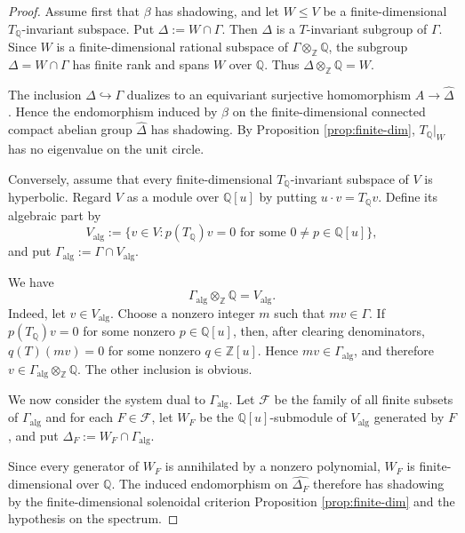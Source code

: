 \documentclass[10pt,a4paper]{amsart}
\begin{document}
\begin{proof}
Assume first that $\beta$ has shadowing, and let $W\leq V$ be a
finite-dimensional $T_{\mathbb Q}$-invariant subspace. Put
$\Delta:=W\cap\Gamma$. Then $\Delta$ is a $T$-invariant subgroup of
$\Gamma$. Since $W$ is a finite-dimensional rational subspace of
$\Gamma\otimes_{\mathbb Z}\mathbb Q$, the subgroup
$\Delta=W\cap\Gamma$ has finite rank and spans $W$ over $\mathbb Q$.
Thus
$
\Delta\otimes_{\mathbb Z}\mathbb Q=W.
$

The inclusion $\Delta\hookrightarrow\Gamma$ dualizes to an equivariant
surjective homomorphism $A\to\widehat\Delta$. Hence the endomorphism
induced by $\beta$ on the finite-dimensional connected compact abelian group
$\widehat\Delta$ has shadowing. By Proposition \ref{prop:finite-dim}, $T_{\mathbb Q}|_W$ has no eigenvalue on the unit circle.

Conversely, assume that every finite-dimensional
$T_{\mathbb Q}$-invariant subspace of $V$ is hyperbolic. Regard $V$ as
a module over $\mathbb Q[u]$ by putting $u\cdot v=T_{\mathbb Q}v$.
Define its algebraic part by
\begin{equation*}
V_{\mathrm{alg}}
:=
\{v\in V:p(T_{\mathbb Q})v=0
\text{ for some }0\neq p\in\mathbb Q[u]\},
\end{equation*}
and put $\Gamma_{\mathrm{alg}}:=\Gamma\cap V_{\mathrm{alg}}$.

We have
\[
\Gamma_{\mathrm{alg}}\otimes_{\mathbb Z}\mathbb Q
=
V_{\mathrm{alg}}.
\]
Indeed, let $v\in V_{\mathrm{alg}}$. Choose a nonzero integer $m$
such that $mv\in\Gamma$. If
$p(T_{\mathbb Q})v=0$ for some nonzero $p\in\mathbb Q[u]$, then,
after clearing denominators,
$q(T)(mv)=0$ for some nonzero $q\in\mathbb Z[u]$. Hence
$mv\in\Gamma_{\mathrm{alg}}$, and therefore
$v\in\Gamma_{\mathrm{alg}}\otimes_{\mathbb Z}\mathbb Q$. The other inclusion is obvious.

We now consider the system dual to $\Gamma_{\mathrm{alg}}$. Let $\mathcal F$ be the family of all finite subsets of $\Gamma_{\mathrm{alg}}$ and for each $F\in \mathcal F$, let $W_F$ be the $\mathbb Q[u]$-submodule of
$V_{\mathrm{alg}}$ generated by $F$, and
put $\Delta_F:=W_F\cap\Gamma_{\mathrm{alg}}$.

Since every generator of $W_F$ is annihilated by a nonzero polynomial,
$W_F$ is finite-dimensional over $\mathbb Q$. The induced
endomorphism on $\widehat{\Delta_F}$ therefore has shadowing by the
finite-dimensional solenoidal criterion Proposition \ref{prop:finite-dim} and the hypothesis on the
spectrum.


\end{proof}
\end{document}
